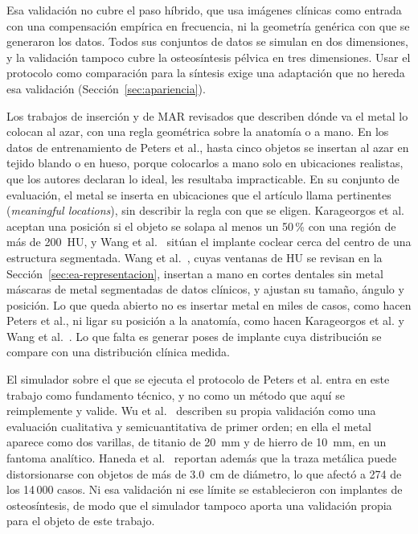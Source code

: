 Esa validación no cubre el paso híbrido, que usa imágenes clínicas como entrada con una compensación empírica en frecuencia, ni la geometría genérica con que se generaron los datos. Todos sus conjuntos de datos se simulan en dos dimensiones, y la validación tampoco cubre la osteosíntesis pélvica en tres dimensiones. Usar el protocolo como comparación para la síntesis exige una adaptación que no hereda esa validación (Sección~\ref{sec:apariencia}).

Los trabajos de inserción y de MAR revisados que describen dónde va el metal lo colocan al azar, con una regla geométrica sobre la anatomía o a mano. En los datos de entrenamiento de Peters et al., hasta cinco objetos se insertan al azar en tejido blando o en hueso, porque colocarlos a mano solo en ubicaciones realistas, que los autores declaran lo ideal, les resultaba impracticable. En su conjunto de evaluación, el metal se inserta en ubicaciones que el artículo llama pertinentes (\emph{meaningful locations}), sin describir la regla con que se eligen. Karageorgos et al. aceptan una posición si el objeto se solapa al menos un 50\,\% con una región de más de 200~HU, y Wang et al.~\cite{wang2019cochlear} sitúan el implante coclear cerca del centro de una estructura segmentada. Wang et al.~\cite{wang2025adaptiveweighting}, cuyas ventanas de HU se revisan en la Sección~\ref{sec:ea-representacion}, insertan a mano en cortes dentales sin metal máscaras de metal segmentadas de datos clínicos, y ajustan su tamaño, ángulo y posición. Lo que queda abierto no es insertar metal en miles de casos, como hacen Peters et al., ni ligar su posición a la anatomía, como hacen Karageorgos et al. y Wang et al.~\cite{wang2019cochlear}. Lo que falta es generar poses de implante cuya distribución se compare con una distribución clínica medida.

El simulador sobre el que se ejecuta el protocolo de Peters et al. entra en este trabajo como fundamento técnico, y no como un método que aquí se reimplemente y valide. Wu et al.~\cite{wu2022xcist} describen su propia validación como una evaluación cualitativa y semicuantitativa de primer orden; en ella el metal aparece como dos varillas, de titanio de 20~mm y de hierro de 10~mm, en un fantoma analítico. Haneda et al.~\cite{haneda2025aapm} reportan además que la traza metálica puede distorsionarse con objetos de más de 3.0~cm de diámetro, lo que afectó a 274 de los 14\,000 casos. Ni esa validación ni ese límite se establecieron con implantes de osteosíntesis, de modo que el simulador tampoco aporta una validación propia para el objeto de este trabajo.

